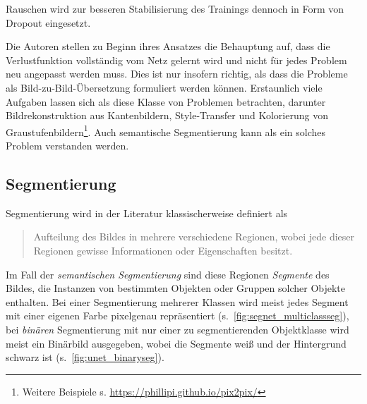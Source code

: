 Rauschen wird zur besseren Stabilisierung des Trainings dennoch in Form von Dropout eingesetzt.

Die Autoren stellen zu Beginn ihres Ansatzes die Behauptung auf, dass die Verlustfunktion vollständig vom Netz gelernt wird und nicht für jedes Problem neu angepasst werden muss.
Dies ist nur insofern richtig, als dass die Probleme als Bild-zu-Bild-Übersetzung formuliert werden können.
Erstaunlich viele Aufgaben lassen sich als diese Klasse von Problemen betrachten, darunter Bildrekonstruktion aus Kantenbildern, Style-Transfer und Kolorierung von Graustufenbildern\footnote{Weitere Beispiele s. \url{https://phillipi.github.io/pix2pix/}}.
Auch semantische Segmentierung kann als ein solches Problem verstanden werden.



\subsection{Segmentierung}

Segmentierung wird in der Literatur klassischerweise definiert als

\begin{quote}Aufteilung des Bildes in mehrere verschiedene Regionen, wobei jede dieser Regionen gewisse Informationen oder Eigenschaften besitzt.~\cite[S.~29]{Ens.2011}\end{quote}

Im Fall der \emph{semantischen Segmentierung} sind diese Regionen \emph{Segmente} des Bildes, die Instanzen von bestimmten Objekten oder Gruppen solcher Objekte enthalten.
Bei einer Segmentierung mehrerer Klassen wird meist jedes Segment mit einer eigenen Farbe pixelgenau repräsentiert (s.~\autoref{fig:segnet_multiclassseg}), bei \emph{binären} Segmentierung mit nur einer zu segmentierenden Objektklasse wird meist ein Binärbild ausgegeben, wobei die Segmente weiß und der Hintergrund schwarz ist (s.~\autoref{fig:unet_binaryseg}).

